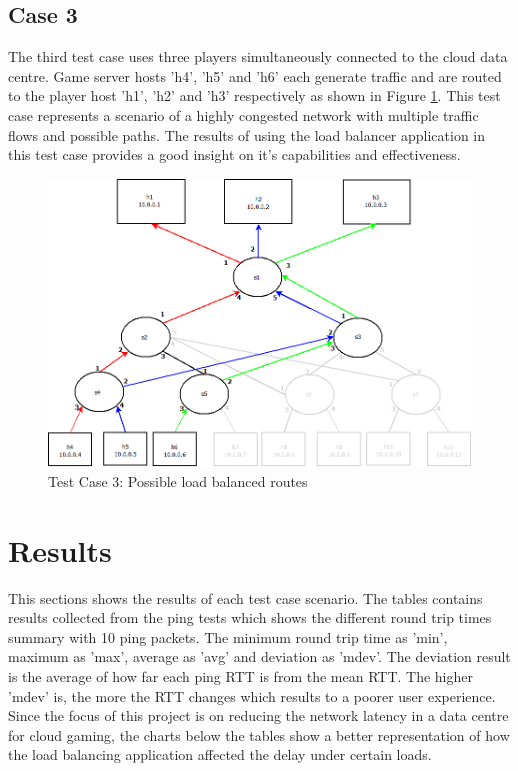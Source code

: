 \subsection{Case 3}
The third test case uses three players simultaneously connected to the cloud data centre. Game server hosts 'h4', 'h5' and 'h6' each generate traffic and are routed to the player host 'h1', 'h2' and 'h3' respectively as shown in Figure \ref{fig:test3}. This test case represents a scenario of a highly congested network with multiple traffic flows and possible paths. The results of using the load balancer application in this test case provides a good insight on it's capabilities and effectiveness.
\newline
\begin{figure}[h!]
 \includegraphics[width=\linewidth]{images/test3.png}
 \caption{Test Case 3: Possible load balanced routes}
 \label{fig:test3}
\end{figure}

\clearpage
\section{Results}

This sections shows the results of each test case scenario. The tables contains results collected from the ping tests which shows the different round trip times summary with 10 ping packets. The minimum round trip time as 'min', maximum as 'max', average as 'avg' and deviation as 'mdev'. The deviation result is the average of how far each ping RTT is from the mean RTT. The higher 'mdev' is, the more the RTT changes which results to a poorer user experience. Since the focus of this project is on reducing the network latency in a data centre for cloud gaming, the charts below the tables show a better representation of how the load balancing application affected the delay under certain loads.

